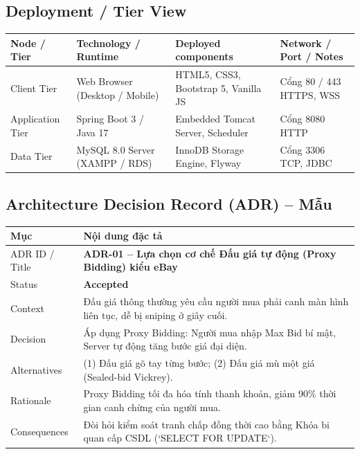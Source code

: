 \documentclass[11pt,a4paper]{article}
\begin{document}
\subsection{Deployment / Tier View}
\begin{table}[H]
    \centering
    \small
    \begin{tabularx}{\textwidth}{|l|l|X|l|}
        \hline
        \textbf{Node / Tier} & \textbf{Technology / Runtime} & \textbf{Deployed components} & \textbf{Network / Port / Notes} \\ \hline
        Client Tier & Web Browser (Desktop / Mobile) & HTML5, CSS3, Bootstrap 5, Vanilla JS & Cổng 80 / 443 HTTPS, WSS \\ \hline
        Application Tier & Spring Boot 3 / Java 17 & Embedded Tomcat Server, Scheduler & Cổng 8080 HTTP \\ \hline
        Data Tier & MySQL 8.0 Server (XAMPP / RDS) & InnoDB Storage Engine, Flyway & Cổng 3306 TCP, JDBC \\ \hline
    \end{tabularx}
\end{table}

\subsection{Architecture Decision Record (ADR) -- Mẫu}
\begin{table}[H]
    \centering
    \small
    \begin{tabularx}{\textwidth}{|l|X|}
        \hline
        \textbf{Mục} & \textbf{Nội dung đặc tả} \\ \hline
        ADR ID / Title & \textbf{ADR-01 -- Lựa chọn cơ chế Đấu giá tự động (Proxy Bidding) kiểu eBay} \\ \hline
        Status & \textbf{Accepted} \\ \hline
        Context & Đấu giá thông thường yêu cầu người mua phải canh màn hình liên tục, dễ bị sniping ở giây cuối. \\ \hline
        Decision & Áp dụng Proxy Bidding: Người mua nhập Max Bid bí mật, Server tự động tăng bước giá đại diện. \\ \hline
        Alternatives & (1) Đấu giá gõ tay từng bước; (2) Đấu giá mù một giá (Sealed-bid Vickrey). \\ \hline
        Rationale & Proxy Bidding tối đa hóa tính thanh khoản, giảm 90\% thời gian canh chừng của người mua. \\ \hline
        Consequences & Đòi hỏi kiểm soát tranh chấp đồng thời cao bằng Khóa bi quan cấp CSDL (`SELECT FOR UPDATE`). \\ \hline
    \end{tabularx}
\end{table}
\end{document}
